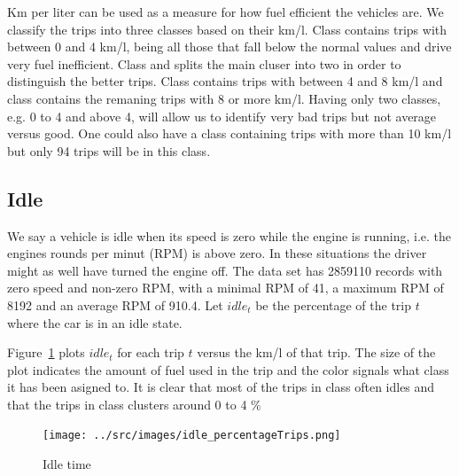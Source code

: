 Km per liter can be used as a measure for how fuel efficient the vehicles are.
We classify the trips into three classes based on their km/l.
Class \fuelLow contains trips with between 0 and 4 km/l, being all those that fall below the normal values and drive very fuel inefficient.
Class \fuelMedium and \fuelHigh splits the main cluser into two in order to distinguish the better trips.
Class \fuelMedium contains trips with between 4 and 8 km/l and class \fuelHigh contains the remaning trips with 8 or more km/l.
Having only two classes, e.g. 0 to 4 and above 4, will allow us to identify very bad trips but not average versus good. 
One could also have a class containing trips with more than 10 km/l but only 94 trips will be in this class. %

\subsection{Idle}
We say a vehicle is idle when its speed is zero while the engine is running, i.e. the engines rounds per minut (RPM) is above zero. 
In these situations the driver might as well have turned the engine off.
The data set has 2859110 records with zero speed and non-zero RPM, with a minimal RPM of 41, a maximum RPM of 8192 and an average RPM of 910.4. %
Let $idle_t$ be the percentage of the trip $t$ where the car is in an idle state.

Figure~\ref{fig:idleTrips} plots $idle_t$ for each trip $t$ versus the km/l of that trip.
The size of the plot indicates the amount of fuel used in the trip and the color signals what class it has been asigned to. 
It is clear that most of the trips in class \fuelLow often idles and that the trips in class \fuelHigh clusters around 0 to 4 \%

\begin{figure}[htb]
\centering
\texttt{[image: ../src/images/idle\_percentageTrips.png]}
\caption{Idle time}
\label{fig:idleTrips}
\end{figure}


